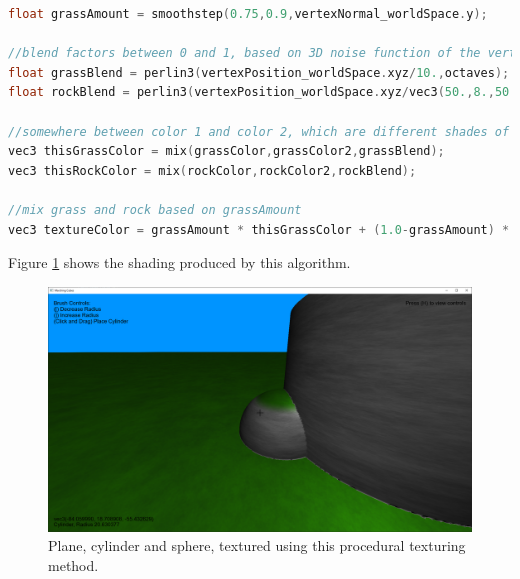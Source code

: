 \documentclass[11pt]{article}
\begin{document}
\begin{lstlisting}[language=C++,label={procedural_shading},caption={Part of the fragment shader used to determine the color of each pixel. We use noise to interpolate between different shades of a color, rather than using a flat color. The variable \texttt{grassAmount} determines how much grass is visible at a given point. The noise used to define the rock color has been stretched in the x and z directions. The result is a color that changes more quickly as the y coordinate changes.}]
float grassAmount = smoothstep(0.75,0.9,vertexNormal_worldSpace.y);

//blend factors between 0 and 1, based on 3D noise function of the vertex position
float grassBlend = perlin3(vertexPosition_worldSpace.xyz/10.,octaves);
float rockBlend = perlin3(vertexPosition_worldSpace.xyz/vec3(50.,8.,50.),octaves);

//somewhere between color 1 and color 2, which are different shades of green, gray respectively
vec3 thisGrassColor = mix(grassColor,grassColor2,grassBlend);
vec3 thisRockColor = mix(rockColor,rockColor2,rockBlend);

//mix grass and rock based on grassAmount
vec3 textureColor = grassAmount * thisGrassColor + (1.0-grassAmount) * thisRockColor;    
\end{lstlisting}
Figure \ref{fig:procedural_shading_shapes} shows the shading produced by this algorithm.
\begin{figure}[H]
  \includegraphics[width=\textwidth]{procedural_shading_shapes.png}
  \caption{Plane, cylinder and sphere, textured using this procedural texturing method.}
  \label{fig:procedural_shading_shapes}
\end{figure}
\end{document}
